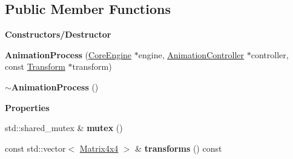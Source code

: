 \subsection*{Public Member Functions}
\begin{Indent}\textbf{ Constructors/\+Destructor}\par
\begin{DoxyCompactItemize}
\item 
\mbox{\label{classrev_1_1_animation_process_a98af6fb130f7926ebf83bf416fbba777}} 
{\bfseries Animation\+Process} (\mbox{\hyperlink{classrev_1_1_core_engine}{Core\+Engine}} $\ast$engine, \mbox{\hyperlink{classrev_1_1_animation_controller}{Animation\+Controller}} $\ast$controller, const \mbox{\hyperlink{classrev_1_1_transform}{Transform}} $\ast$transform)
\item 
\mbox{\label{classrev_1_1_animation_process_ab87c8cd6893f24632c8bd8a8eb529eca}} 
{\bfseries $\sim$\+Animation\+Process} ()
\end{DoxyCompactItemize}
\end{Indent}
\begin{Indent}\textbf{ Properties}\par
\begin{DoxyCompactItemize}
\item 
\mbox{\label{classrev_1_1_animation_process_acbec23dfb1a1555d9f541a9ce29c043f}} 
std\+::shared\+\_\+mutex \& {\bfseries mutex} ()
\item 
\mbox{\label{classrev_1_1_animation_process_a379abdf42674267ee1fda2816406f031}} 
const std\+::vector$<$ \mbox{\hyperlink{classrev_1_1_square_matrix}{Matrix4x4}} $>$ \& {\bfseries transforms} () const
\end{DoxyCompactItemize}
\end{Indent}

